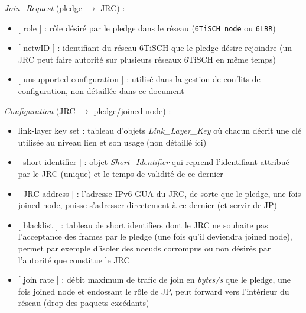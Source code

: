 \documentclass[]{report}
\begin{document}
\vspace{0.2cm}
\noindent\textit{Join\_Request} (pledge $\rightarrow$ JRC) : 
\begin{itemize}[label=$\bullet$]
\item {} [ role ] : rôle désiré par le pledge dans le réseau (\texttt{6TiSCH node} ou \texttt{6LBR})
\item {} [ netwID ] : identifiant du réseau 6TiSCH que le pledge désire rejoindre (un JRC peut faire autorité sur plusieurs réseaux 6TiSCH en même temps)
\item {} [ unsupported configuration ] : utilisé dans la gestion de conflits de configuration, non détaillée dans ce document
\end{itemize}

\vspace{0.3cm}
\noindent\textit{Configuration} (JRC $\rightarrow$ pledge/joined node) : 
\begin{itemize}[label=$\bullet$]
\item link-layer key set : tableau d'objets \textit{Link\_Layer\_Key} où chacun décrit une clé utilisée au niveau lien et son usage (non détaillé ici)
\item {} [ short identifier ] : objet \textit{Short\_Identifier} qui reprend l'identifiant attribué par le JRC (unique) et le temps de validité de ce dernier
\item {} [ JRC address ] : l'adresse IPv6 GUA du JRC, de sorte que le pledge, une fois joined node, puisse s'adresser directement à ce dernier (et servir de JP)
\item {} [ blacklist ] : tableau de short identifiers dont le JRC ne souhaite pas l'acceptance des frames par le pledge (une fois qu'il deviendra joined node), permet par exemple d'isoler des noeuds corrompus ou non désirés par l'autorité que constitue le JRC
\item {} [ join rate ] : débit maximum de trafic de join en \textit{bytes/s} que le pledge, une fois joined node et endossant le rôle de JP, peut forward vers l'intérieur du réseau (drop des paquets excédants)
\end{itemize}

\newpage
\end{document}
